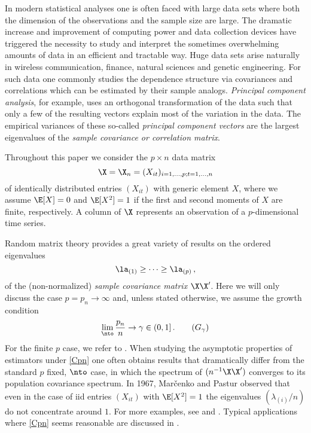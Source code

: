 In modern statistical analyses one is often faced with large data sets where both the dimension of the observations and the sample size are large. The dramatic increase and improvement of computing power and data collection devices have triggered the necessity to study and interpret the sometimes overwhelming amounts of data in an efficient and tractable way. Huge data sets arise naturally in wireless communication, finance, natural sciences and genetic engineering.
For such data one commonly studies the dependence structure via covariances and correlations which can be estimated by their sample analogs. {\em Principal component analysis}, for example, uses an orthogonal transformation of the data such that only a few of the resulting vectors explain most of the variation in the data. The empirical variances of these so-called {\em principal component vectors} are the largest eigenvalues of the {\em sample covariance or correlation matrix}.  

Throughout this paper we consider the $p\times n$ data matrix
\begin{equation*}
\X=\X_n=(X_{it})_{i=1,\ldots,p; t=1,\ldots,n}
\end{equation*}
of identically distributed entries $(X_{it})$ with generic element $X$, where we assume $\E[X]=0$ and $\E[X^2]=1$ if the first and second moments of $X$ are finite, respectively. A column of $\X$ represents an observation of a $p$-dimensional time series. 

Random matrix theory provides a great variety of results on the ordered eigenvalues
\begin{equation}\label{eq:deflambda}
\la_{(1)} \ge \cdots \ge\la_{(p)}\,,
\end{equation}
of the (non-normalized) {\em sample covariance matrix} $\X\X'$. Here we will only discuss the case $p=p_n \to \infty$ and, unless stated otherwise, we assume the growth condition  
\begin{equation}\label{Cpn}
\lim_{\nto} \frac{p_n}{n}\to \gamma\in (0,1]\,. \tag{$G_{\gamma}$}
\end{equation} 
For the finite $p$ case, we refer to \cite{anderson:1963,muirhead,janssen:mikosch:rezapour:xie:2016}.
When studying the asymptotic properties of estimators under \eqref{Cpn}
one often obtains results that dramatically differ from the standard $p$ fixed, $\nto$ case, in which the spectrum of $(n^{-1}\X\X')$ converges to its population covariance spectrum. In 1967, Mar\v cenko and Pastur \cite{marchenko:pastur:1967} observed that even in the case of iid entries $(X_{it})$ with $\E[X^2]=1$ the eigenvalues $(\lambda_{(i)}/n)$ do not concentrate around $1$. For more examples, see \cite[Chapter 1]{bai:silverstein:2010} and \cite{elkaroui:2009}. Typical applications where \eqref{Cpn} seems reasonable are discussed in \cite{johnstone:2001,donoho:2000}. 
\par

